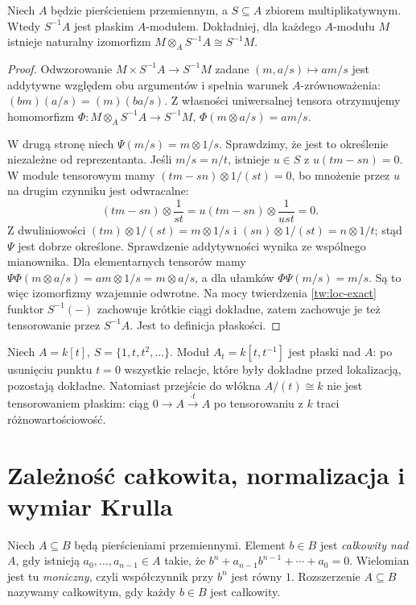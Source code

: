\begin{twierdzenie}
\label{tw:lokalizacja-plaska}
Niech $A$ będzie pierścieniem przemiennym, a $S\subseteq A$
zbiorem multiplikatywnym. Wtedy $S^{-1}A$ jest płaskim
$A$-modułem. Dokładniej, dla każdego $A$-modułu $M$
istnieje naturalny izomorfizm
$M\otimes_A S^{-1}A\cong S^{-1}M$.
\end{twierdzenie}
\begin{proof}
Odwzorowanie $M\times S^{-1}A\to S^{-1}M$ zadane
$(m,a/s)\mapsto am/s$ jest addytywne względem obu
argumentów i spełnia warunek $A$-zrównoważenia:
$(bm)(a/s)=(m)(ba/s)$. Z własności uniwersalnej
tensora otrzymujemy homomorfizm
$\Phi:M\otimes_A S^{-1}A\to S^{-1}M$,
$\Phi(m\otimes a/s)=am/s$.

W drugą stronę niech $\Psi(m/s)=m\otimes 1/s$.
Sprawdzimy, że jest to określenie niezależne od
reprezentanta. Jeśli $m/s=n/t$, istnieje $u\in S$
z $u(tm-sn)=0$. W module tensorowym mamy
$(tm-sn)\otimes 1/(st)=0$, bo mnożenie przez
$u$ na drugim czynniku jest odwracalne:
\[
 (tm-sn)\otimes\frac1{st}
 =u(tm-sn)\otimes\frac1{ust}=0.
\]
Z dwuliniowości
$(tm)\otimes 1/(st)=m\otimes 1/s$ i
$(sn)\otimes 1/(st)=n\otimes 1/t$;
stąd $\Psi$ jest dobrze określone. Sprawdzenie
addytywności wynika ze wspólnego mianownika.
Dla elementarnych tensorów mamy
$\Psi\Phi(m\otimes a/s)=am\otimes1/s
=m\otimes a/s$, a dla ułamków
$\Phi\Psi(m/s)=m/s$. Są to więc izomorfizmy
wzajemnie odwrotne. Na mocy twierdzenia
\ref{tw:loc-exact} funktor $S^{-1}(-)$ zachowuje
krótkie ciągi dokładne, zatem zachowuje je też
tensorowanie przez $S^{-1}A$. Jest to definicja
płaskości.
\end{proof}

\begin{przyklad}
Niech $A=k[t]$, $S=\{1,t,t^2,\ldots\}$.
Moduł $A_t=k[t,t^{-1}]$ jest płaski nad $A$:
po usunięciu punktu $t=0$ wszystkie relacje,
które były dokładne przed lokalizacją, pozostają
dokładne. Natomiast przejście do włókna
$A/(t)\cong k$ nie jest tensorowaniem płaskim:
ciąg $0\to A\xrightarrow{\cdot t}A$ po
tensorowaniu z $k$ traci różnowartościowość.
\end{przyklad}

\section{Zależność całkowita, normalizacja i wymiar Krulla}
\label{sec:integral}
\begin{definicja}
Niech $A\subseteq B$ będą pierścieniami przemiennymi.
Element $b\in B$ jest \emph{całkowity nad $A$},
gdy istnieją $a_0,\ldots,a_{n-1}\in A$ takie, że
$b^n+a_{n-1}b^{n-1}+\cdots+a_0=0$.
Wielomian jest tu \emph{moniczny}, czyli współczynnik
przy $b^n$ jest równy $1$. Rozszerzenie $A\subseteq B$
nazywamy całkowitym, gdy każdy $b\in B$ jest całkowity.
\end{definicja}

